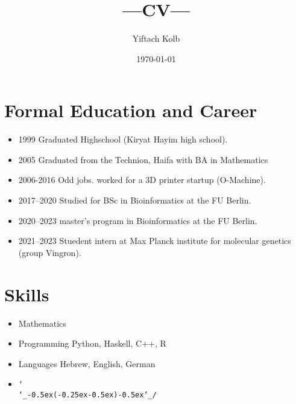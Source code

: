 \documentclass[a4paper,10pt]{article}
\def\shrug{\texttt{\raisebox{0.75em}{\char`\_}\char`\\\char`\_\kern-0.5ex(\kern-0.25ex\raisebox{0.25ex}{\rotatebox{45}{\raisebox{-.75ex}"\kern-1.5ex\rotatebox{-90})}}\kern-0.5ex)\kern-0.5ex\char`\_/\raisebox{0.75em}{\char`\_}}}
\begin{document}




\title{---CV---}
\author{Yiftach Kolb}
\date{\today}

\maketitle

\section*{Formal Education and Career}

\begin{itemize}
\item{1999} Graduated Highschool (Kiryat Hayim high school).
\item{2005} Graduated from the Technion, Haifa with BA in Mathematics
\item{2006-2016} Odd jobs.
worked for a 3D printer startup (O-Machine).
\item{2017--2020} Studied for BSc in Bioinformatics at the FU Berlin.
\item{2020--2023} master's program in Bioinformatics at the FU Berlin.
\item{2021--2023} Stuedent intern at Max Planck institute for molecular genetics (group Vingron).
\end{itemize}

\section*{Skills}
\begin{itemize}
\item{Mathematics}
\item{Programming}
\subitem{} Python, Haskell, C++, R
\item{Languages}
\subitem{} Hebrew, English, German
\item{}
\subitem{}
\normalsize\shrug


\end{itemize}



\nocite{mpgvaeRepo}
\nocite{mg22Repo}
\printbibliography
\end{document}
